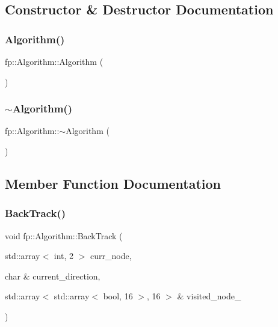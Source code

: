 \subsection{Constructor \& Destructor Documentation}
\mbox{\label{classfp_1_1_algorithm_adaa1af41614b0d95c2a940cc87c68a2e}} 
\subsubsection{\texorpdfstring{Algorithm()}{Algorithm()}}
{\footnotesize\ttfamily fp\+::\+Algorithm\+::\+Algorithm (\begin{DoxyParamCaption}{ }\end{DoxyParamCaption})\hspace{0.3cm}{\ttfamily [inline]}}

\mbox{\label{classfp_1_1_algorithm_aefb8012b9e6457191d7fc16affe5a700}} 
\subsubsection{\texorpdfstring{$\sim$\+Algorithm()}{~Algorithm()}}
{\footnotesize\ttfamily fp\+::\+Algorithm\+::$\sim$\+Algorithm (\begin{DoxyParamCaption}{ }\end{DoxyParamCaption})\hspace{0.3cm}{\ttfamily [default]}}



\subsection{Member Function Documentation}
\mbox{\label{classfp_1_1_algorithm_ab272faa6f88e5edbe2f8c19b2988ae16}} 
\subsubsection{\texorpdfstring{Back\+Track()}{BackTrack()}}
{\footnotesize\ttfamily void fp\+::\+Algorithm\+::\+Back\+Track (\begin{DoxyParamCaption}\item[{std\+::array$<$ int, 2 $>$}]{curr\+\_\+node,  }\item[{char \&}]{current\+\_\+direction,  }\item[{std\+::array$<$ std\+::array$<$ bool, 16 $>$, 16 $>$ \&}]{visited\+\_\+node\+\_\+ }\end{DoxyParamCaption})}


